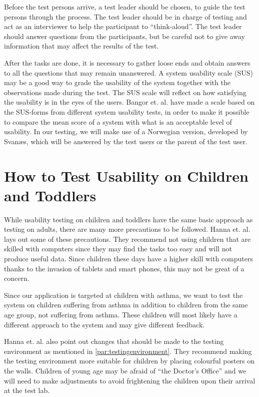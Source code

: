 Before the test persons arrive, a test leader should be chosen, to guide the test persons through the process. The test leader should be in charge of testing and act as an interviewer to help the participant to ``think-aloud''\cite{lewis1982using}. The test leader should answer questions from the participants, but be careful not to give away information that may affect the results of the test.

After the tasks are done, it is necessary to gather loose ends and obtain answers to all the questions that may remain unanswered. A system usability scale (SUS)\cite{sus} may be a good way to grade the usability of the system together with the observations made during the test. The SUS scale will reflect on how satisfying the usability is in the eyes of the users. Bangor et. al.\cite{susform} have made a scale based on the SUS-forms from different system usability tests, in order to make it possible to compare the mean score of a system with what is an acceptable level of usability. In our testing, we will make use of a Norwegian version, developed by Svan\ae s, which will be answered by the test users or the parent of the test user.


\section{How to Test Usability on Children and Toddlers}
\label{sec:usabilitytestchildren}
While usability testing on children and toddlers have the same basic approach as testing on adults, there are many more precautions to be followed. 
Hanna et. al.\cite{testingenvironmentforchildren} lays out some of these precautions. They recommend not using children that are skilled with computers since they may find the tasks too easy and will not produce useful data. 
Since children these days have a higher skill with computers thanks to the invasion of tablets and smart phones\cite{babiesusageoftablets}, this may not be great of a concern. 

Since our application is targeted at children with asthma, we want to test the system on children suffering from asthma in addition to children from the same age group, not suffering from asthma. These children will most likely have a different approach to the system and may give different feedback.

Hanna et. al. also point out changes that should be made to the testing environment as mentioned in \ref{par:testingenvironment}. They recommend making the testing environment more suitable for children by placing colourful posters on the walls.
Children of young age may be afraid of ``the Doctor's Office'' and we will need to make adjustments to avoid frightening the children upon their arrival at the test lab. 

